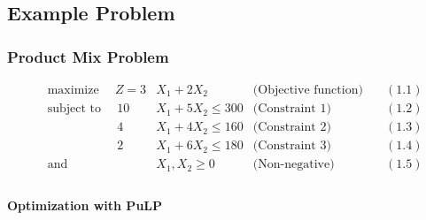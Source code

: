     \hypertarget{example-problem}{%
\subsection{Example Problem}\label{example-problem}}

\hypertarget{product-mix-problem}{%
\subsubsection{Product Mix Problem}\label{product-mix-problem}}

\begin{align*}
  & \text{maximize }   &   Z=3&X_{1}+2X_{2}         & \text{(Objective function)} &\quad(1.1)\\[1ex]
  & \text{subject to } & \, 10&X_{1}+5X_{2} \le 300 & \text{(Constraint 1)}       &\quad(1.2)\\[1ex]
  &                    & \,  4&X_{1}+4X_{2} \le 160 & \text{(Constraint 2)}       &\quad(1.3)\\[1ex]  
  &                    & \,  2&X_{1}+6X_{2} \le 180 & \text{(Constraint 3)}       &\quad(1.4)\\[1ex] 
  & \text{and}         & \,   &X_{1},X_{2} \ge 0    & \text{(Non-negative)}       &\quad(1.5)\\[1ex] 
\end{align*}

    \hypertarget{optimization-with-pulp}{%
\paragraph{Optimization with PuLP}\label{optimization-with-pulp}}

